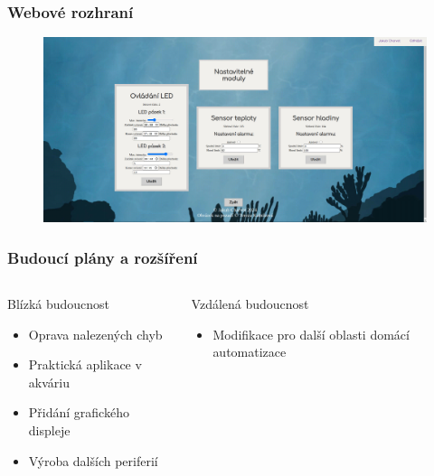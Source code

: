 \documentclass[%
  12pt,       				%
	t,                  %
	aspectratio=1610,   %
	unicode,						%
]{beamer}				    	%
\begin{document}
\begin{frame}[fragile]
	\frametitle{Webové rozhraní}
	\vspace{-1cm}
	\begin{figure}%
		\includegraphics[width=1.05\textwidth]{obrazky/prezentace/web/web.jpg}
	\end{figure}
\end{frame}


\begin{frame}[fragile]
	\frametitle{Budoucí plány a rozšíření}

	\begin{columns}[T] 								%
		\begin{column}{0.5\textwidth}		%
			\begin{block}{Blízká budoucnost}
				\begin{itemize}
					\item Oprava nalezených chyb
					\item Praktická aplikace v akváriu
					\item Přidání grafického displeje
					\item Výroba dalších periferií
				\end{itemize}
			\end{block}
		\end{column}
		\begin{column}{0.5\textwidth}		%
			\begin{alertblock}{Vzdálená budoucnost}
				\begin{itemize}
					\item Modifikace pro další oblasti domácí automatizace

				\end{itemize}
			\end{alertblock}
		\end{column}
	\end{columns}											%
\end{frame}
\end{document}
